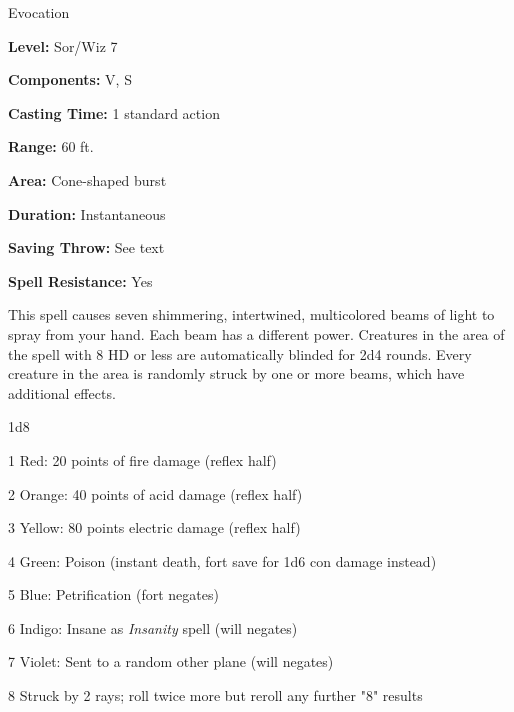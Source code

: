 
Evocation

\textbf{Level:} Sor/Wiz 7

\textbf{Components:} V, S

\textbf{Casting Time:} 1 standard action

\textbf{Range:} 60 ft.

\textbf{Area:} Cone-shaped burst

\textbf{Duration:} Instantaneous

\textbf{Saving Throw:} See text

\textbf{Spell Resistance:} Yes

This spell causes seven shimmering, intertwined, multicolored beams of light to 
spray from your hand. Each beam has a different power. Creatures in the area of 
the spell with 8 HD or less are automatically blinded for 2d4 rounds. Every creature 
in the area is randomly struck by one or more beams, which have additional effects.

\begin{description*}
\item[1d8]
\item[1] Red: 20 points of fire damage (reflex half)
\item[2] Orange: 40 points of acid damage (reflex half)
\item[3] Yellow: 80 points electric damage (reflex half)
\item[4] Green: Poison (instant death, fort save for 1d6 con damage instead)
\item[5] Blue: Petrification (fort negates)
\item[6] Indigo: Insane as \textit{Insanity} spell (will negates)
\item[7] Violet: Sent to a random other plane (will negates)
\item[8] Struck by 2 rays; roll twice more but reroll any further "8" results
\end{description*}

